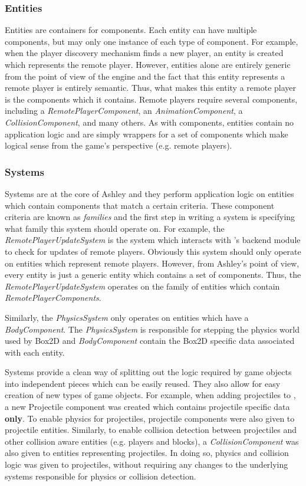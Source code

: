\subsubsection{Entities}
Entities are containers for components. Each entity can have multiple components, but may only one instance of each type of component. For example, when the player discovery mechanism finds a new player, an entity is created which represents the remote player. However, entities alone are entirely generic from the point of view of the engine and the fact that this entity represents a remote player is entirely semantic. Thus, what makes this entity a remote player is the components which it contains. Remote players require several components, including a \textit{RemotePlayerComponent}, an \textit{AnimationComponent}, a \textit{CollisionComponent}, and many others. As with components, entities contain no application logic and are simply wrappers for a set of components which make logical sense from the game's perspective (e.g. remote players).

\subsubsection{Systems}
Systems are at the core of Ashley and they perform application logic on entities which contain components that match a certain criteria. These component criteria are known as \textit{families} and the first step in writing a system is specifying what family this system should operate on. For example, the \textit{RemotePlayerUpdateSystem} is the system which interacts with \game{}'s backend module to check for updates of remote players. Obviously this system should only operate on entities which represent remote players. However, from Ashley's point of view, every entity is just a generic entity which contains a set of components. Thus, the \textit{RemotePlayerUpdateSystem} operates on the family of entities which contain \textit{RemotePlayerComponents}. 

Similarly, the \textit{PhysicsSystem} only operates on entities which have a \textit{BodyComponent}. The \textit{PhysicsSystem} is responsible for stepping the physics world used by Box2D and \textit{BodyComponent} contain the Box2D specific data associated with each entity.

Systems provide a clean way of splitting out the logic required by game objects into independent pieces which can be easily reused. They also allow for easy creation of new types of game objects. For example, when adding projectiles to \game{}, a new Projectile component was created which contains projectile specific data \textbf{only}. To enable physics for projectiles, projectile components were also given to projectile entities. Similarly, to enable collision detection between projectiles and other collision aware entities (e.g. players and blocks), a \textit{CollisionComponent} was also given to entities representing projectiles. In doing so, physics and collision logic was given to projectiles, without requiring any changes to the underlying systems responsible for physics or collision detection.

